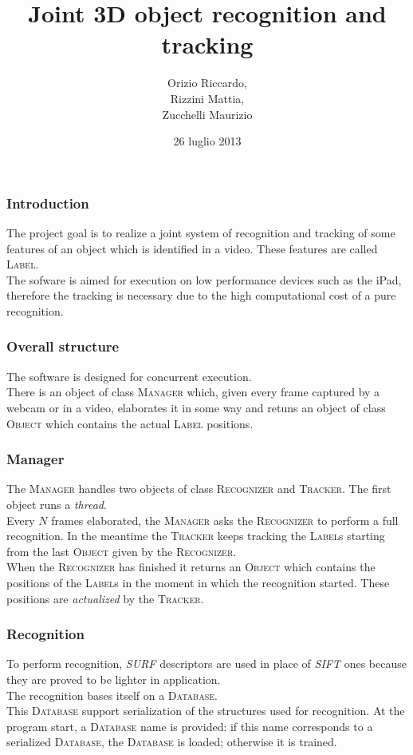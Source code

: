 \documentclass{beamer}
\title{Joint 3D object recognition and tracking}
\author[Orizio, Rizzini, Zucchelli]{Orizio Riccardo,\\Rizzini Mattia,\\Zucchelli Maurizio}
\date{26 luglio 2013}
\institute[UniBS]{Universit\`{a} degli Studi di Brescia}
\begin{document}
	\begin{frame}
		\maketitle
	\end{frame}
	
	\begin{frame}
		\frametitle{Introduction}
		The project goal is to realize a joint system of recognition and tracking
		of some features of an object which is identified in a video.
		These features are called \textsc{Label}.\\
		The sofware is aimed for execution on low performance devices such as the
		iPad, therefore the tracking is necessary due to the high computational
		cost of a pure recognition.\\
	\end{frame}

	\begin{frame}
		\frametitle{Overall structure}
		The software is designed for concurrent execution.\\
		There is an object of class \textsc{Manager} which, given every frame
		captured by a webcam or in a video, elaborates it in some way and retuns
		an object of class \textsc{Object} which contains the actual \textsc{Label}
		positions.\\
	\end{frame}

	\begin{frame}
		\frametitle{Manager}
		The \textsc{Manager} handles two objects of class \textsc{Recognizer} and
		\textsc{Tracker}. The first object runs a \emph{thread}.\\
		Every $N$ frames elaborated, the \textsc{Manager} asks the
		\textsc{Recognizer} to perform a full recognition. In the meantime the
		\textsc{Tracker} keeps tracking the \textsc{Label}s starting from the last
		\textsc{Object} given by the \textsc{Recognizer}.\\
		When the \textsc{Recognizer} has finished it returns an \textsc{Object}
		which contains the positions of the \textsc{Label}s in the moment in which
		the recognition started. These positions are \emph{actualized} by the
		\textsc{Tracker}.\\
	\end{frame}

	\begin{frame}
		\frametitle{Recognition}
		To perform recognition, \emph{SURF} descriptors are used in place of
		\emph{SIFT} ones because they are proved to be lighter in application.\\
		The recognition bases itself on a \textsc{Database}.\\
		This \textsc{Database} support serialization of the structures used for
		recognition. At the program start, a \textsc{Database} name is provided:
		if this name corresponds to a serialized \textsc{Database}, the
		\textsc{Database} is loaded; otherwise it is trained.\\
	\end{frame}
\end{document}
